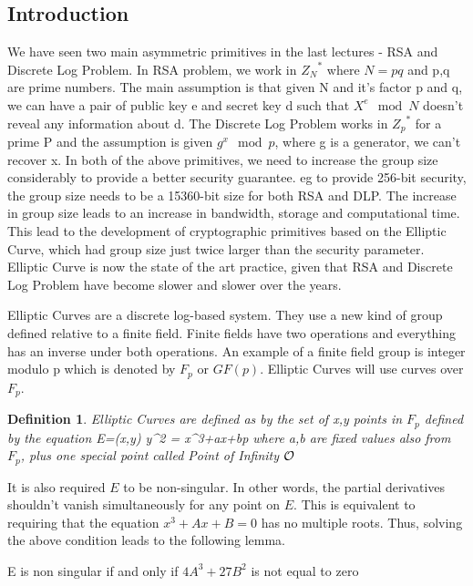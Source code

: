 

\subsection{Introduction}

We have seen two main asymmetric primitives in the last lectures - RSA and Discrete Log Problem. In RSA problem, we work in ${Z_N}^*$ where $N=pq$ and p,q are prime numbers. The main assumption is that given N and it's factor p and q, we can have a pair of public key e and secret key d such that $X^e \mod N$ doesn't reveal any information about d. The Discrete Log Problem works in ${Z_p}^*$ for a prime P and the assumption is given $g^x \mod p$, where g is a generator, we can't recover x. In both of the above primitives, we need to increase the group size considerably to provide a better security guarantee. eg to provide 256-bit security, the group size needs to be a 15360-bit size for both RSA and DLP. The increase in group size leads to an increase in bandwidth, storage and computational time. This lead to the development of cryptographic primitives based on the Elliptic Curve, which had group size just twice larger than the security parameter. Elliptic Curve is now the state of the art practice, given that RSA and Discrete Log Problem have become slower and slower over the years.

Elliptic Curves are a discrete log-based system. They use a new kind of group defined relative to a finite field. Finite fields have two operations and everything has an inverse under both operations. An example of a finite field group is integer modulo p which is denoted by $F_p$ or $GF(p)$. Elliptic Curves will use curves over $F_p$.  

\newtheorem{df}{Definition}
\begin{df}
Elliptic Curves are defined as by the set of x,y points in $F_p$ defined by the equation 
\bnm
E={(x,y) \mid y^2 = x^3+ax+b\mod p}
\enm 
where a,b are fixed values also from $F_p$, plus one special point called Point of Infinity $\cal O$
\end{df}

It is also required $E$ to be non-singular. In other words,
the partial derivatives shouldn't vanish simultaneously for any point
on $E$. This is equivalent to requiring that the
equation $x^{3}+Ax+B=0$ has no multiple roots. Thus, solving the above condition leads to the following lemma.

\begin{lemma}
 E is non singular if and only if $4A^{3} + 27B^{2}$ is not equal to zero
\end{lemma}


